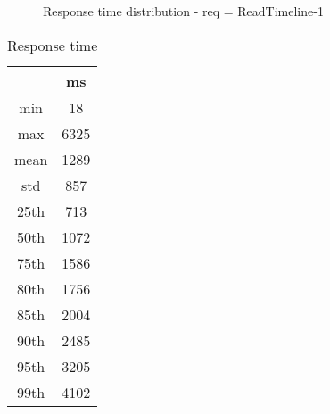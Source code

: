 \begin{minipage}{0.75\linewidth}
\begin{figure}[h]
\begin{adjustbox}{max width=1.0\linewidth, keepaspectratio}
  \end{adjustbox}
  \caption{Response time distribution - req = ReadTimeline-1}
\end{figure}
\end{minipage}\hfill\begin{minipage}{0.18\linewidth}
\begin{table}[h]
\begin{tabular}{|cc|}
\hline
\textbf{} & \textbf{ms}\\ \hline
 \Xhline{0.005\arrayrulewidth}
min & 18\\
 \Xhline{0.005\arrayrulewidth}
max & 6325\\
 \Xhline{0.005\arrayrulewidth}
mean & 1289\\
 \Xhline{0.005\arrayrulewidth}
std & 857\\
\hline
\hline
 \Xhline{0.005\arrayrulewidth}
25th & 713\\
 \Xhline{0.005\arrayrulewidth}
50th & 1072\\
 \Xhline{0.005\arrayrulewidth}
75th & 1586\\
 \Xhline{0.005\arrayrulewidth}
80th & 1756\\
 \Xhline{0.005\arrayrulewidth}
85th & 2004\\
 \Xhline{0.005\arrayrulewidth}
90th & 2485\\
 \Xhline{0.005\arrayrulewidth}
95th & 3205\\
 \Xhline{0.005\arrayrulewidth}
99th & 4102\\
\hline
\end{tabular}
\caption{Response time}
\end{table}
\end{minipage}\hfill